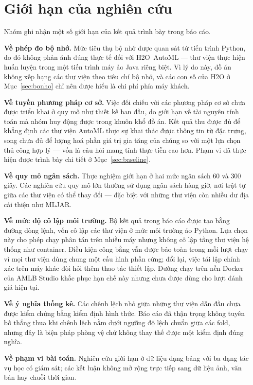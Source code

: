 \section{Giới hạn của nghiên cứu}
\label{sec:hanche}
Nhóm ghi nhận một số giới hạn của kết quả trình bày trong báo cáo.

\textbf{Về phép đo bộ nhớ.} Mức tiêu thụ bộ nhớ được quan sát từ tiến trình
Python, do đó không phản ánh đúng thực tế đối với H2O~AutoML --- thư viện thực
hiện huấn luyện trong một tiến trình máy ảo Java riêng biệt. Vì lý do này, đồ án
không xếp hạng các thư viện theo tiêu chí bộ nhớ, và các con số của H2O ở
Mục~\ref{sec:bonho} chỉ nên được hiểu là chi phí phía máy khách.

\textbf{Về tuyến phương pháp cơ sở.} Việc đối chiếu với các phương pháp cơ sở chưa
được triển khai ở quy mô như thiết kế ban đầu, do giới hạn về tài nguyên tính toán
mà nhóm huy động được trong khuôn khổ đồ án. Kết quả thu được đủ để khẳng định các
thư viện AutoML thực sự khai thác được thông tin từ đặc trưng, song chưa đủ để
lượng hoá phần giá trị gia tăng của chúng so với một lựa chọn thủ công hợp lý ---
vốn là câu hỏi mang tính thực tiễn cao hơn. Phạm vi đã thực hiện được trình bày
chi tiết ở Mục~\ref{sec:baseline}.

\textbf{Về quy mô ngân sách.} Thực nghiệm giới hạn ở hai mức ngân sách $60$ và
$300$ giây. Các nghiên cứu quy mô lớn thường sử dụng ngân sách hàng giờ, nơi trật
tự giữa các thư viện có thể thay đổi --- đặc biệt với những thư viện còn nhiều dư
địa cải thiện như MLJAR.

\textbf{Về mức độ cô lập môi trường.} Bộ kết quả trong báo cáo được tạo bằng đường
dòng lệnh, vốn cô lập các thư viện ở mức môi trường ảo Python. Lựa chọn này cho
phép chạy phân tán trên nhiều máy nhưng không cô lập tầng thư viện hệ thống như
container. Điều kiện công bằng vẫn được bảo toàn trong mỗi lượt chạy vì mọi thư
viện dùng chung một cấu hình phần cứng; đổi lại, việc tái lập chính xác trên máy
khác đòi hỏi thêm thao tác thiết lập. Đường chạy trên nền Docker của AMLB Studio
khắc phục hạn chế này nhưng chưa được dùng cho lượt đánh giá hiện tại.

\textbf{Về ý nghĩa thống kê.} Các chênh lệch nhỏ giữa những thư viện dẫn đầu chưa
được kiểm chứng bằng kiểm định hình thức. Báo cáo đã thận trọng không tuyên bố
thắng thua khi chênh lệch nằm dưới ngưỡng độ lệch chuẩn giữa các fold, nhưng đây
là biện pháp phòng vệ chứ không thay thế được một kiểm định đúng nghĩa.

\textbf{Về phạm vi bài toán.} Nghiên cứu giới hạn ở dữ liệu dạng bảng với ba dạng
tác vụ học có giám sát; các kết luận không mở rộng trực tiếp sang dữ liệu ảnh, văn
bản hay chuỗi thời gian.

